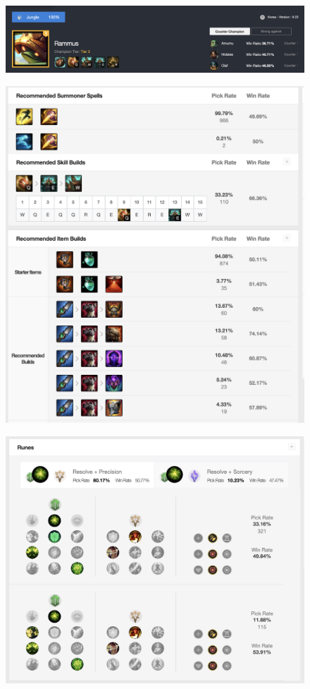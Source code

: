 \documentclass[10pt,landscape,a4paper,twocolumn]{article}
\begin{document}
\begin{figure}[ht]
\includegraphics[scale=0.3]{4}
\end{figure}
\begin{figure}[ht]
\includegraphics[scale=0.3]{5}
\end{figure}
\begin{figure}[ht]
\includegraphics[scale=0.3]{6}
\end{figure}
\end{document}

